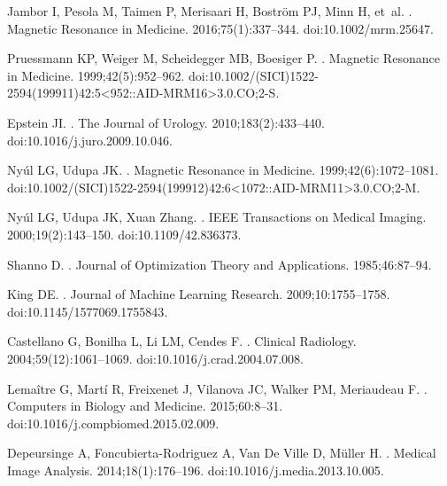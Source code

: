 \documentclass[10pt,letterpaper]{article}
\begin{document}
\begin{thebibliography}{10}
Jambor I, Pesola M, Taimen P, Merisaari H, Bostr{\"{o}}m PJ, Minn H, et~al.
.
\newblock Magnetic Resonance in Medicine. 2016;75(1):337--344.
\newblock doi:{10.1002/mrm.25647}.

Pruessmann KP, Weiger M, Scheidegger MB, Boesiger P.
.
\newblock Magnetic Resonance in Medicine. 1999;42(5):952--962.
\newblock doi:{10.1002/(SICI)1522-2594(199911)42:5<952::AID-MRM16>3.0.CO;2-S}.

Epstein JI.
.
\newblock The Journal of Urology. 2010;183(2):433--440.
\newblock doi:{10.1016/j.juro.2009.10.046}.

Ny{\'{u}}l LG, Udupa JK.
.
\newblock Magnetic Resonance in Medicine. 1999;42(6):1072--1081.
\newblock doi:{10.1002/(SICI)1522-2594(199912)42:6<1072::AID-MRM11>3.0.CO;2-M}.

Ny{\'{u}}l LG, Udupa JK, {Xuan Zhang}.
.
\newblock IEEE Transactions on Medical Imaging. 2000;19(2):143--150.
\newblock doi:{10.1109/42.836373}.

Shanno D.
.
\newblock Journal of Optimization Theory and Applications. 1985;46:87--94.

King DE.
.
\newblock Journal of Machine Learning Research. 2009;10:1755--1758.
\newblock doi:{10.1145/1577069.1755843}.

Castellano G, Bonilha L, Li LM, Cendes F.
.
\newblock Clinical Radiology. 2004;59(12):1061--1069.
\newblock doi:{10.1016/j.crad.2004.07.008}.

Lema{\^{i}}tre G, Mart{\'{i}} R, Freixenet J, Vilanova JC, Walker PM,
  Meriaudeau F.
.
\newblock Computers in Biology and Medicine. 2015;60:8--31.
\newblock doi:{10.1016/j.compbiomed.2015.02.009}.

Depeursinge A, Foncubierta-Rodriguez A, {Van De Ville} D, M{\"{u}}ller H.
.
\newblock Medical Image Analysis. 2014;18(1):176--196.
\newblock doi:{10.1016/j.media.2013.10.005}.


\end{thebibliography}
\end{document}
